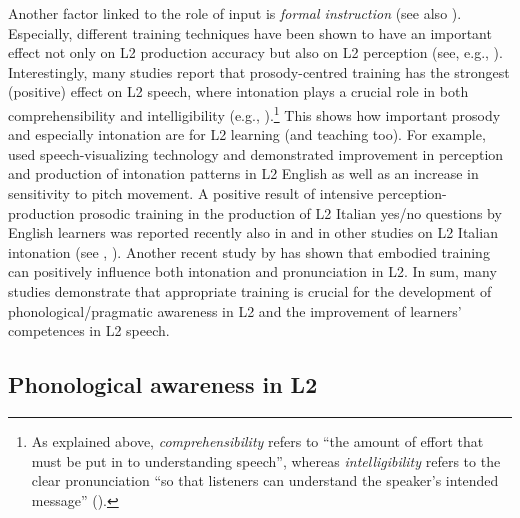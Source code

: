 Another factor linked to the role of input is \textit{formal instruction} (see also ). Especially, different training techniques have been shown to have an important effect not only on L2 production accuracy but also on L2 perception (see, e.g., \citealt{Henning1966, MacdonaldEtAl1994, BongaertsEtAl1997, BradlowEtAl1997, Missaglia1999, DerwingEtAl1998, Moyer1999, WangMunro2004, IversonEtAl2005, TannerLandon2009, SaitoLyster2012}). Interestingly, many studies report that prosody-centred training has the strongest (positive) effect on L2 speech, where intonation plays a crucial role in both comprehensibility and intelligibility (e.g., \citealt{deBotMailfert1982, deBot1983, WeltensdeBot1984, DerwingRossiter2003, LevisPickering2004, Lengeris2012}).\footnote{As explained above, \textit{comprehensibility} refers to “the amount of effort that must be put in to understanding speech”, whereas \textit{intelligibility} refers to the clear pronunciation “so that listeners can understand the speaker’s intended message” (\citealt[1 and 3]{DerwingMunro2015}).} This shows how important prosody and especially intonation are for L2 learning (and teaching too). For example, \citet{LevisPickering2004} used speech-visualizing technology and demonstrated improvement in perception and production of intonation patterns in L2 English as well as an increase in sensitivity to pitch movement. A positive result of intensive perception-production prosodic training in the production of L2 Italian yes/no questions by English learners was reported recently also in \citet{NicoraEtAl2018} and in other studies on L2 Italian intonation (see , ). Another recent study by \citet{Kushch2018} has shown that embodied training can positively influence both intonation and pronunciation in L2. In sum, many studies demonstrate that appropriate training is crucial for the development of phonological\slash pragmatic awareness in L2 and the improvement of learners’ competences in L2 speech.


\subsection{Phonological awareness in L2}\label{sec:2.1.5}

